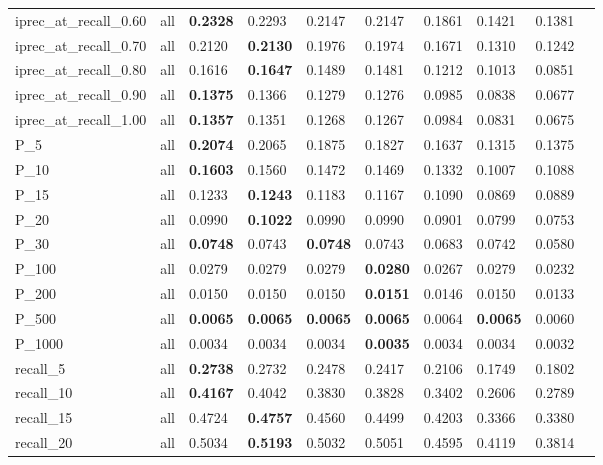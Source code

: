 \begin{table}[tbp]
\begin{tabular}{|l|l|l|l|l|l|l|l|l|l|}
        iprec\_at\_recall\_0.60 & all & \textbf{0.2328} & 0.2293 & 0.2147 & 0.2147 & 0.1861 & 0.1421 & 0.1381  \\ 
        iprec\_at\_recall\_0.70 & all & 0.2120 & \textbf{0.2130} & 0.1976 & 0.1974 & 0.1671 & 0.1310 & 0.1242  \\ 
        iprec\_at\_recall\_0.80 & all & 0.1616 & \textbf{0.1647} & 0.1489 & 0.1481 & 0.1212 & 0.1013 & 0.0851  \\ 
        iprec\_at\_recall\_0.90 & all & \textbf{0.1375} & 0.1366 & 0.1279 & 0.1276 & 0.0985 & 0.0838 & 0.0677  \\ 
        iprec\_at\_recall\_1.00 & all & \textbf{0.1357} & 0.1351 & 0.1268 & 0.1267 & 0.0984 & 0.0831 & 0.0675  \\ \midrule
        P\_5 & all & \textbf{0.2074} & 0.2065 & 0.1875 & 0.1827 & 0.1637 & 0.1315 & 0.1375  \\ 
        P\_10 & all & \textbf{0.1603} & 0.1560 & 0.1472 & 0.1469 & 0.1332 & 0.1007 & 0.1088  \\ 
        P\_15 & all & 0.1233 & \textbf{0.1243} & 0.1183 & 0.1167 & 0.1090 & 0.0869 & 0.0889  \\ 
        P\_20 & all & 0.0990 & \textbf{0.1022} & 0.0990 & 0.0990 & 0.0901 & 0.0799 & 0.0753  \\ 
        P\_30 & all & \textbf{0.0748} & 0.0743 & \textbf{0.0748} & 0.0743 & 0.0683 & 0.0742 & 0.0580  \\ 
        P\_100 & all & 0.0279 & 0.0279 & 0.0279 & \textbf{0.0280} & 0.0267 & 0.0279 & 0.0232  \\ 
        P\_200 & all & 0.0150 & 0.0150 & 0.0150 & \textbf{0.0151} & 0.0146 & 0.0150 & 0.0133  \\ 
        P\_500 & all & \textbf{0.0065} & \textbf{0.0065} & \textbf{0.0065} & \textbf{0.0065} & 0.0064 & \textbf{0.0065} & 0.0060  \\ 
        P\_1000 & all & 0.0034 & 0.0034 & 0.0034 & \textbf{0.0035} & 0.0034 & 0.0034 & 0.0032  \\ \midrule
        recall\_5 & all & \textbf{0.2738} & 0.2732 & 0.2478 & 0.2417 & 0.2106 & 0.1749 & 0.1802  \\ 
        recall\_10 & all & \textbf{0.4167} & 0.4042 & 0.3830 & 0.3828 & 0.3402 & 0.2606 & 0.2789  \\ 
        recall\_15 & all & 0.4724 & \textbf{0.4757} & 0.4560 & 0.4499 & 0.4203 & 0.3366 & 0.3380  \\ 
        recall\_20 & all & 0.5034 & \textbf{0.5193} & 0.5032 & 0.5051 & 0.4595 & 0.4119 & 0.3814  \\ 

\end{tabular}
\end{table}
